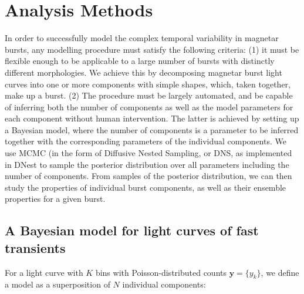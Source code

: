 \documentclass[12pt]{emulateapj}
\newcommand{\counts}{y}
\begin{document}
\section{Analysis Methods}
\label{ch6:methods}
In order to successfully model the complex temporal variability in magnetar bursts, any modelling procedure must satisfy the following criteria: (1) it must be flexible enough to be applicable to a large number of bursts with distinctly different morphologies. We achieve this by decomposing magnetar burst light curves into one or more components with simple shapes, which, taken together, make up a burst. (2) The procedure must be largely automated, and be capable of inferring both the number of components as well as the model parameters for each component without human intervention. The latter is achieved by setting up a Bayesian model, where the number of components is a parameter to be inferred together with the corresponding parameters of the individual components. We use MCMC (in the form of Diffusive Nested Sampling, or DNS, as implemented in DNest \citep{brewer2011} to sample the posterior distribution over all parameters including the number of components. From samples of the posterior distribution,
we can then study the properties of individual burst components, as well as their ensemble properties for a given burst.

\subsection{A Bayesian model for light curves of fast transients}
\label{ch6:model}

For a light curve with $K$ bins with Poisson-distributed counts $\bm{\counts} = \{\counts_k\}$, we define a model as a superposition of $N$ individual components:
\end{document}

